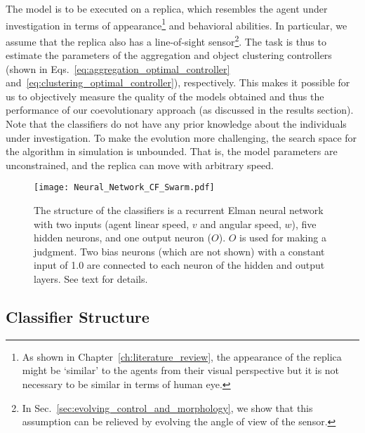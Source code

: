 The model is to be executed on a replica, which resembles the agent under investigation in terms of appearance\footnote{As shown in Chapter~\ref{ch:literature_review}, the appearance of the replica might be `similar'  to the agents from their visual perspective but it is not necessary to be similar in terms of human eye.} and behavioral abilities. In particular, we assume that the replica also has a line-of-sight sensor\footnote{In Sec.~\ref{sec:evolving_control_and_morphology}, we show that this assumption can be relieved by evolving the angle of view of the sensor.}. The task is thus to estimate the parameters of the aggregation and object clustering controllers (shown in Eqs.~\eqref{eq:aggregation_optimal_controller} and~\eqref{eq:clustering_optimal_controller}), respectively. This makes it possible for us to objectively measure the quality of the models obtained and thus the performance of our coevolutionary approach (as discussed in the results section). Note that the classifiers do not have any prior knowledge about the individuals under investigation. To make the evolution more challenging, the search space for the algorithm in simulation is unbounded. That is, the model parameters are unconstrained, and the replica can move with arbitrary speed. 

\begin{figure}[!t]
	\centering
	\texttt{[image: Neural\_Network\_CF\_Swarm.pdf]}
	\caption{The structure of the classifiers is a recurrent Elman neural 
    network with two inputs (agent linear speed, $v$ and angular speed, $w$), five hidden neurons, and one output neuron ($O$). $O$ is used for making a judgment. Two bias neurons (which are not shown) with a constant input of 1.0 are connected to each neuron of the hidden and output layers. See text for details.}
	\label{fig:neural_network_cf_swarm}
\end{figure}

\subsection{Classifier Structure}

